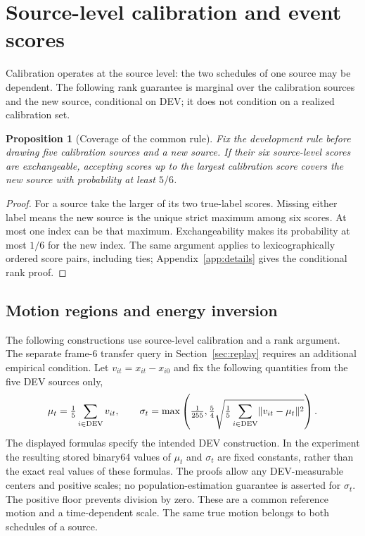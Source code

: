 \documentclass[11pt]{article}
\theoremstyle{noteplain}
\newtheorem{proposition}{Proposition}
\newcommand{\norm}[1]{\lVert #1\rVert}
\begin{document}
\section{Source-level calibration and event scores}\label{sec:calibration}
Calibration operates at the source level: the two schedules of one source may be dependent. The following rank guarantee is marginal over the calibration sources and the new source, conditional on DEV; it does not condition on a realized calibration set.

\begin{proposition}[Coverage of the common rule]
Fix the development rule before drawing five calibration sources and a new source. If their six source-level scores are exchangeable, accepting scores up to the largest calibration score covers the new source with probability at least $5/6$.
\end{proposition}
\begin{proof}
For a source take the larger of its two true-label scores. Missing either label means the new source is the unique strict maximum among six scores. At most one index can be that maximum. Exchangeability makes its probability at most $1/6$ for the new index. The same argument applies to lexicographically ordered score pairs, including ties; Appendix~\ref{app:details} gives the conditional rank proof.
\end{proof}
\subsection{Motion regions and energy inversion}
The following constructions use source-level calibration and a rank argument. The separate frame-6 transfer query in Section~\ref{sec:replay} requires an additional empirical condition. Let $v_{it}=x_{it}-x_{i0}$ and fix the following quantities from the five DEV sources only,
\[
 \mu_t=\tfrac15\sum_{i\in{\rm DEV}}v_{it},\qquad
 \sigma_t=\max\left(\tfrac1{255},
  \tfrac54\sqrt{\tfrac15\sum_{i\in{\rm DEV}}\norm{v_{it}-\mu_t}^2}\right).
\]
The displayed formulas specify the intended DEV construction. In the experiment the resulting stored binary64 values of $\mu_t$ and $\sigma_t$ are fixed constants, rather than the exact real values of these formulas. The proofs allow any DEV-measurable centers and positive scales; no population-estimation guarantee is asserted for $\sigma_t$. The positive floor prevents division by zero. These are a common reference motion and a time-dependent scale. The same true motion belongs to both schedules of a source.
\end{document}
